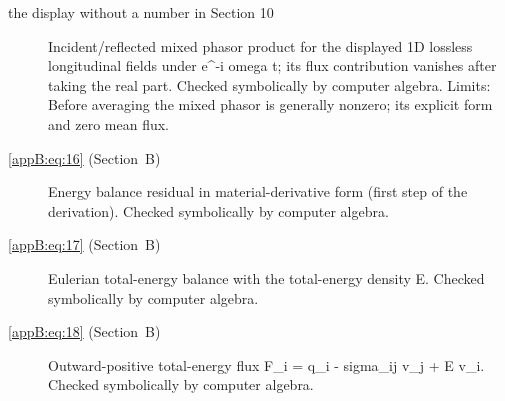 \begin{description}
  \item[the display without a number in Section 10] Incident/reflected mixed phasor product for the displayed 1D lossless longitudinal fields under e^{-i omega t}; its flux contribution vanishes after taking the real part. Checked symbolically by computer algebra. Limits: Before averaging the mixed phasor is generally nonzero; its explicit form and zero mean flux.

  \item[\eqref{appB:eq:16} (Section~B)] Energy balance residual in material-derivative form (first step of the derivation). Checked symbolically by computer algebra.

  \item[\eqref{appB:eq:17} (Section~B)] Eulerian total-energy balance with the total-energy density E. Checked symbolically by computer algebra.

  \item[\eqref{appB:eq:18} (Section~B)] Outward-positive total-energy flux F_i = q_i - sigma_ij v_j + E v_i. Checked symbolically by computer algebra.
\end{description}
